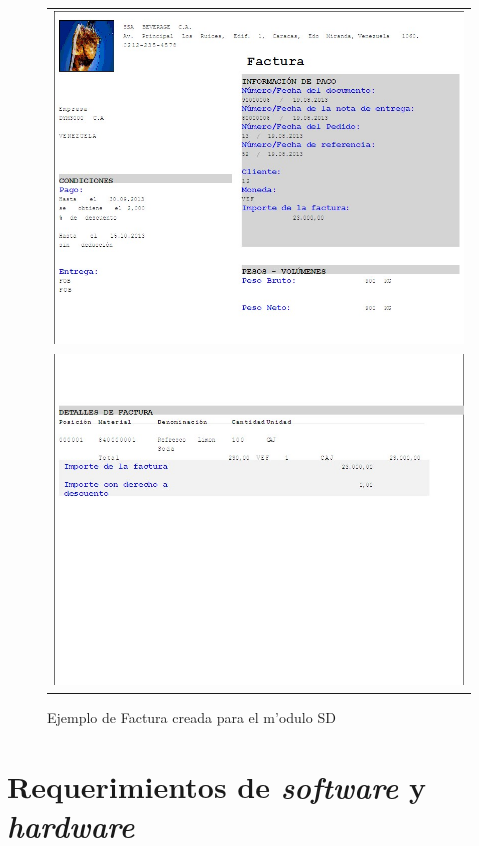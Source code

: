 \begin{figure}[htb]
\centering
\begin{tabular}{c}
\includegraphics[scale=0.65,type=jpg,ext=.jpg,read=.jpg]{figures/Factura1}\\
\includegraphics[scale=0.65,type=jpg,ext=.jpg,read=.jpg]{figures/Factura2}\\
\end{tabular}
\caption{Ejemplo de Factura creada para el m'odulo SD}
\label{fig:facturas}
\end{figure}


\section{Requerimientos de {\it software} y {\it hardware}}
\label{sect:hardsoftrequirements}

